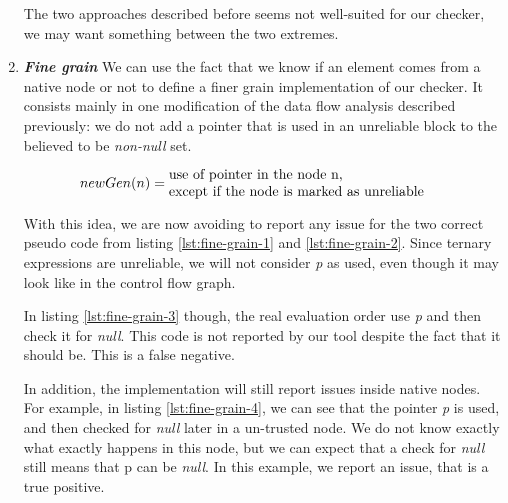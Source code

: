 \begin{enumerate}
The two approaches described before seems not well-suited for our checker, we may want something between the two extremes.

\item \textbf{\textit{Fine grain}} \newline
We can use the fact that we know if an element comes from a native node or not to define a finer grain implementation of our checker. 
It consists mainly in one modification of the data flow analysis described previously: we do not add a pointer that is used in an unreliable block to the believed to be \emph{non-null} set.

\begin{equation}\label{eqn:new_dataflow4}
newGen(n) = \parbox{7cm}{use of pointer in the node n, \newline except if the node is marked as unreliable}
\end{equation}





With this idea, we are now avoiding to report any issue for the two correct pseudo code from listing \ref{lst:fine-grain-1} and \ref{lst:fine-grain-2}. Since ternary expressions are unreliable, we will not consider \emph{p} as used, even though it may look like in the control flow graph.



In listing \ref{lst:fine-grain-3} though, the real evaluation order use \emph{p} and then check it for \emph{null}. 
This code is not reported by our tool despite the fact that it should be. This is a false negative.\newline



In addition, the implementation will still report issues inside native nodes.
For example, in listing \ref{lst:fine-grain-4}, we can see that the pointer \emph{p} is used, and then checked for \emph{null} later in a un-trusted node. We do not know exactly what exactly happens in this node, but we can expect that a check for \emph{null} still means that p can be \emph{null}. 
In this example, we report an issue, that is a true positive.
\end{enumerate}

